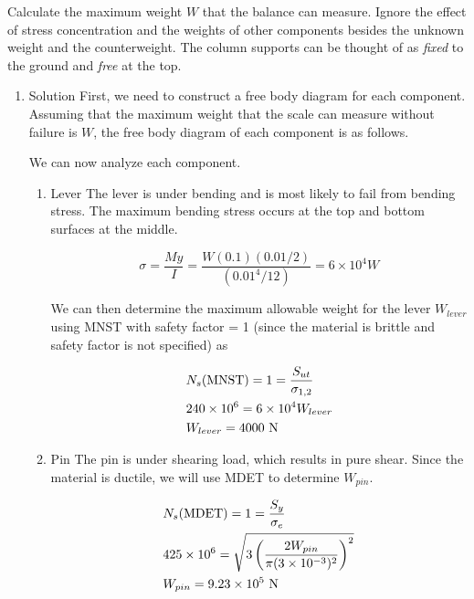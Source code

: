 \documentclass[a4paper,openany,12pt]{book}
\begin{document}
{{Calculate the maximum weight \(W\) that the balance can measure. Ignore
the effect of stress concentration and the weights of other components
besides the unknown weight and the counterweight. The column supports
can be thought of as \emph{fixed} to the ground and \emph{free} at the top.

\begin{enumerate}
\item Solution
\label{sec:org1e68805}
First, we need to construct a free body diagram for each component.
Assuming that the maximum weight that the scale can measure without
failure is \(W\), the free body diagram of each component is as follows.


We can now analyze each component.

\begin{enumerate}
\item Lever
\label{sec:org57871b7}
The lever is under bending and is most likely to fail from bending
stress. The maximum bending stress occurs at the top and bottom surfaces
at the middle.

$$\sigma  = \frac{My}{I} = \frac{W(0.1)(0.01/2)}{(0.01^4/12)} = 6 \times
  10^4W$$

We can then determine the maximum allowable weight for the lever
\(W_{lever}\) using MNST with safety factor = 1 (since the material is
brittle and safety factor is not specified) as

$$\begin{gathered}
  N_s\text{(MNST)} = 1 = \frac{S_{ut}}{\sigma _{1,2}} \hfill \\
  240 \times {10^6} = 6 \times 10^4W_{lever} \hfill \\
  W_{lever} = 4000\text{ N} \hfill \\ 
\end{gathered}$$

\item Pin
\label{sec:org18ad1e9}
The pin is under shearing load, which results in pure shear. Since the
material is ductile, we will use MDET to determine \(W_{pin}\).

$$\begin{gathered}
  N_s\text{(MDET)} = 1 = \frac{S_y}{\sigma_e} \hfill \\
  425 \times 10^6 = \sqrt {3\left( \frac{2W_{pin}}{\pi (3 \times 10^{-3})^2} \right)^2}  \hfill \\
  W_{pin} = 9.23 \times 10^5\text{ N} \hfill \\ 
\end{gathered}$$


\end{enumerate}
\end{enumerate}}}
\end{document}
